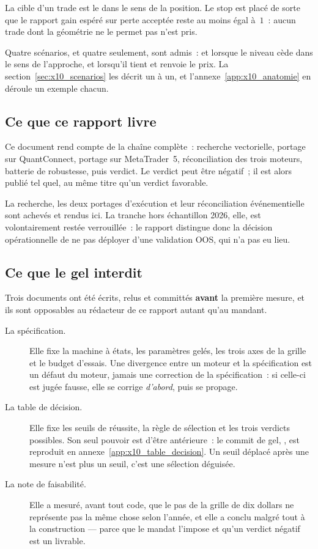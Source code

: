 La cible d'un trade est le  dans le sens de la
position. Le stop est placé de sorte que le rapport gain espéré sur perte
acceptée reste au moins égal à~$1$~: aucun trade dont la géométrie ne le permet
pas n'est pris.

Quatre scénarios, et quatre seulement, sont admis~:  et
 lorsque le niveau cède dans le sens de l'approche,
 et  lorsqu'il tient et renvoie le
prix. La section~\ref{sec:x10_scenarios} les décrit un à un, et
l'annexe~\ref{app:x10_anatomie} en déroule un exemple chacun.

\subsection{Ce que ce rapport livre}

Ce document rend compte de la chaîne complète~: recherche vectorielle, portage
sur QuantConnect, portage sur MetaTrader~5, réconciliation des trois moteurs,
batterie de robustesse, puis verdict. Le verdict peut être négatif~; il est
alors publié tel quel, au même titre qu'un verdict favorable.

La recherche, les deux portages d'exécution et leur réconciliation
événementielle sont achevés et rendus ici. La tranche hors échantillon 2026,
elle, est volontairement restée verrouillée~: le rapport distingue donc la
décision opérationnelle de ne pas déployer d'une validation OOS, qui n'a pas eu
lieu.

\subsection{Ce que le gel interdit}

Trois documents ont été écrits, relus et committés \textbf{avant} la première
mesure, et ils sont opposables au rédacteur de ce rapport autant qu'au
mandant.

\begin{description}
  \item[La spécification.] Elle fixe la machine à états, les paramètres gelés,
  les trois axes de la grille et le budget d'essais. Une divergence entre un
  moteur et la spécification est un défaut du moteur, jamais une correction de
  la spécification~: si celle-ci est jugée fausse, elle se corrige
  \emph{d'abord}, puis se propage.
  \item[La table de décision.] Elle fixe les seuils de réussite, la règle de
  sélection et les trois verdicts possibles. Son seul pouvoir est d'être
  antérieure~: le commit de gel, \code{\XTenFreezeCommit}, est reproduit en
  annexe~\ref{app:x10_table_decision}. Un seuil déplacé après une mesure
  n'est plus un seuil, c'est une sélection déguisée.
  \item[La note de faisabilité.] Elle a mesuré, avant tout code, que le pas de
  la grille de dix dollars ne représente pas la même chose selon l'année, et
  elle a conclu malgré tout à la construction --- parce que le mandat
  l'impose et qu'un verdict négatif est un livrable.
\end{description}

